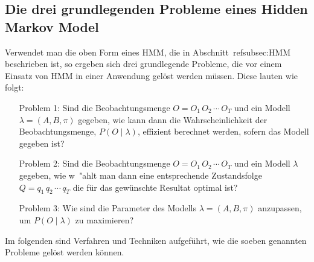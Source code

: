 \subsection[Die drei grundlegenden Probleme eines Hidden Markov Model]{Die drei grundlegenden Probleme eines Hidden
\label{subsec:HMMProbleme}
 Markov Model }
Verwendet man die oben Form eines \acrshort{HMM}, die in Abschnitt~ref{subsec:HMM} beschrieben ist, so ergeben sich drei grundlegende Probleme, die vor einem Einsatz von \gls{HMM} in einer Anwendung gel\"ost werden m\"ussen. Diese lauten wie folgt:
\begin{enumerate}
\item[Problem 1:] Sind die Beobachtungsmenge $O = O_1 \, O_2 \, \cdots \, O_T$ und ein Modell $\lambda = (A, B, \pi)$ gegeben, wie kann dann die Wahrscheinlichkeit der Beobachtungsmenge, $P( O \mid \lambda)$, effizient berechnet werden, sofern das Modell gegeben ist?
\item[Problem 2:] Sind die Beobachtungsmenge $O = O_1 \, O_2 \, \cdots \, O_T$ und ein Modell $\lambda$ gegeben, wie w\
"ahlt man dann eine entsprechende Zustandsfolge $Q = q_1 \, q_2 \, \cdots \, q_T$ die f\"ur das gew\"unschte Resultat optimal ist?
\item[Problem 3:] Wie sind die Parameter des Modells $\lambda =(A, B, \pi)$ anzupassen, um $P ( O \mid \lambda)$ zu maximieren?
\end{enumerate}
Im folgenden sind Verfahren und Techniken aufgef\"uhrt, wie die soeben genannten Probleme gel\"ost werden k\"onnen.

